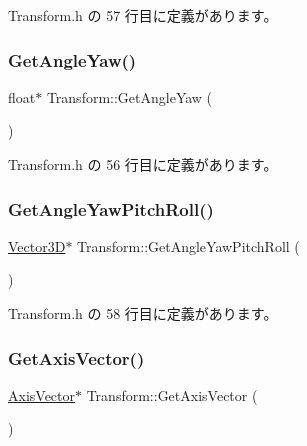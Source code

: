  Transform.\+h の 57 行目に定義があります。

\mbox{\label{class_transform_a8be9cd3526cc18d64e47b55f4c527dd8}} 
\subsubsection{\texorpdfstring{Get\+Angle\+Yaw()}{GetAngleYaw()}}
{\footnotesize\ttfamily float$\ast$ Transform\+::\+Get\+Angle\+Yaw (\begin{DoxyParamCaption}{ }\end{DoxyParamCaption})\hspace{0.3cm}{\ttfamily [inline]}}



 Transform.\+h の 56 行目に定義があります。

\mbox{\label{class_transform_a1bd5cddc216e7fafe12e5b605cb780ea}} 
\subsubsection{\texorpdfstring{Get\+Angle\+Yaw\+Pitch\+Roll()}{GetAngleYawPitchRoll()}}
{\footnotesize\ttfamily \mbox{\hyperlink{class_vector3_d}{Vector3D}}$\ast$ Transform\+::\+Get\+Angle\+Yaw\+Pitch\+Roll (\begin{DoxyParamCaption}{ }\end{DoxyParamCaption})\hspace{0.3cm}{\ttfamily [inline]}}



 Transform.\+h の 58 行目に定義があります。

\mbox{\label{class_transform_ad300be34dddc6109ca142452e65aa77d}} 
\subsubsection{\texorpdfstring{Get\+Axis\+Vector()}{GetAxisVector()}}
{\footnotesize\ttfamily \mbox{\hyperlink{class_axis_vector}{Axis\+Vector}}$\ast$ Transform\+::\+Get\+Axis\+Vector (\begin{DoxyParamCaption}{ }\end{DoxyParamCaption})\hspace{0.3cm}{\ttfamily [inline]}}



